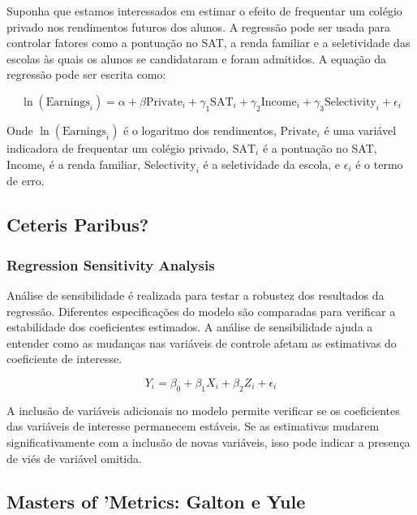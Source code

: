 \documentclass[a4paper,12pt]{article}[abntex2]
\begin{document}
Suponha que estamos interessados em estimar o efeito de frequentar um colégio privado nos rendimentos futuros dos alunos. A regressão pode ser usada para controlar fatores como a pontuação no SAT, a renda familiar e a seletividade das escolas às quais os alunos se candidataram e foram admitidos. A equação da regressão pode ser escrita como:

\begin{equation}
    \ln(\text{Earnings}_i) = \alpha + \beta \text{Private}_i + \gamma_1 \text{SAT}_i + \gamma_2 \text{Income}_i + \gamma_3 \text{Selectivity}_i + \epsilon_i
\end{equation}

Onde \(\ln(\text{Earnings}_i)\) é o logaritmo dos rendimentos, \(\text{Private}_i\) é uma variável indicadora de frequentar um colégio privado, \(\text{SAT}_i\) é a pontuação no SAT, \(\text{Income}_i\) é a renda familiar, \(\text{Selectivity}_i\) é a seletividade da escola, e \(\epsilon_i\) é o termo de erro.

\subsection{Ceteris Paribus?}

\subsubsection*{Regression Sensitivity Analysis}

Análise de sensibilidade é realizada para testar a robustez dos resultados da regressão. Diferentes especificações do modelo são comparadas para verificar a estabilidade dos coeficientes estimados. A análise de sensibilidade ajuda a entender como as mudanças nas variáveis de controle afetam as estimativas do coeficiente de interesse.

\begin{equation}
    Y_i = \beta_0 + \beta_1 X_i + \beta_2 Z_i + \epsilon_i
\end{equation}

A inclusão de variáveis adicionais no modelo permite verificar se os coeficientes das variáveis de interesse permanecem estáveis. Se as estimativas mudarem significativamente com a inclusão de novas variáveis, isso pode indicar a presença de viés de variável omitida.

\subsection*{Masters of 'Metrics: Galton e Yule}
\end{document}
